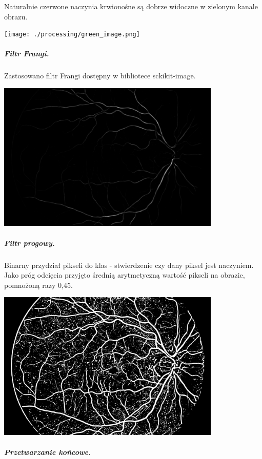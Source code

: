 \documentclass[a4paper, 11pt]{article}
\begin{document}
Naturalnie czerwone naczynia krwionośne są dobrze widoczne w zielonym kanale obrazu.
\begin{center}
	\texttt{[image: ./processing/green\_image.png]}
\end{center}

\newpage
\subparagraph{Filtr Frangi.}


Zastosowano filtr Frangi dostępny w bibliotece sckikit-image.
\begin{center}
	\includegraphics[width=0.8\textwidth]{./processing/frangi_image.png}
\end{center}
\subparagraph{Filtr progowy.}


Binarny przydział pikseli do klas - stwierdzenie czy dany piksel jest naczyniem. Jako próg odcięcia przyjęto średnią arytmetyczną wartość pikseli na obrazie, pomnożoną razy 0,45.
\begin{center}
	\includegraphics[width=0.8\textwidth]{./processing/thresh_image.png}
\end{center}

\newpage
\subparagraph{Przetwarzanie końcowe.}
\end{document}
